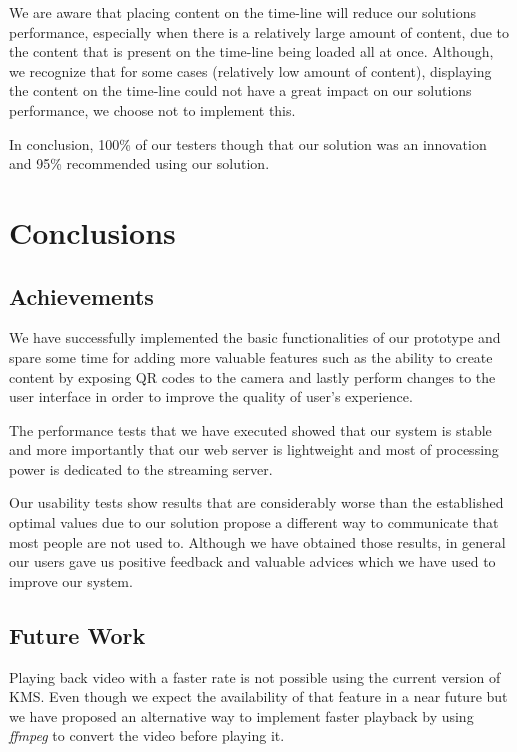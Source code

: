 \documentclass[conference,compsoc,a4paper]{IEEEtran}
\begin{document}
We are aware that placing content on the time-line will reduce our solutions performance, especially when there is a relatively large amount of content, due to the content that is present on the time-line being loaded all at once. Although, we recognize that for some cases (relatively low amount of content), displaying the content on the time-line could not have a great impact on our solutions performance, we choose not to implement this.

In conclusion, 100\% of our testers though that our solution was an innovation and 95\% recommended using our solution.




\section{Conclusions}
\subsection{Achievements}
\label{section:achievements}

	We have successfully implemented the basic functionalities of our prototype and spare some time for adding more valuable features such as the ability to create content by exposing \gls{QR} codes to the camera and lastly perform changes to the user interface in order to improve the quality of user's experience.

	The performance tests that we have executed showed that our system is stable and more importantly that our web server is lightweight and most of processing power is dedicated to the streaming server.

	Our usability tests show results that are considerably worse than the established optimal values due to our solution propose a different way to communicate that most people are not used to. Although we have obtained those results, in general our users gave us positive feedback and valuable advices which we have used to improve our system. 

\subsection{Future Work}
\label{section:future}
	Playing back video with a faster rate is not possible using the current version of \gls{KMS}. Even though we expect the availability of that feature in a near future but we have proposed an alternative way to implement faster playback by using \emph{ffmpeg} to convert the video before playing it.
\end{document}
